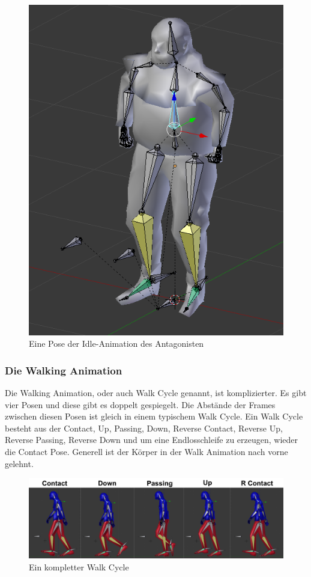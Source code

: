 \begin{figure}[H]
    \centering

    \includegraphics[width=.8\textwidth]{images/animation_an_idle.PNG}
    \caption{Eine Pose der Idle-Animation des Antagonisten}
\end{figure}

\subsubsection{Die Walking Animation}
Die Walking Animation, oder auch Walk Cycle genannt, ist komplizierter. Es gibt vier Posen und diese gibt es doppelt gespiegelt.
Die Abstände der Frames zwischen diesen Posen ist gleich in einem typischem Walk Cycle. Ein Walk Cycle besteht aus der Contact,
Up, Passing, Down, Reverse Contact, Reverse Up, Reverse Passing,
Reverse Down und um eine Endlosschleife zu erzeugen, wieder die Contact Pose. Generell ist der Körper in der Walk Animation nach vorne gelehnt.

\begin{figure}[H]
    \centering

    \includegraphics[width=.8\textwidth]{images/animation_walk_cycle.png}
    \caption{Ein kompletter Walk Cycle}
\end{figure}

